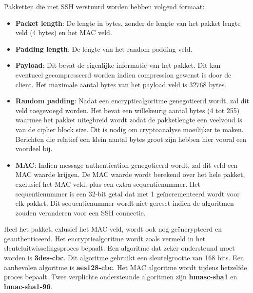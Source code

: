 \documentclass{report}
\begin{document}
Pakketten die met SSH verstuurd worden hebben volgend formaat:
	\begin{itemize}
		\item \textbf{Packet length}: De lengte in bytes, zonder de lengte van het pakket lengte veld (4 bytes) en het MAC veld.
		\item \textbf{Padding length}: De lengte van het random padding veld.
		\item \textbf{Payload}: Dit bevat de eigenlijke informatie van het pakket. Dit kan eventueel gecompresseerd worden indien compression gewenst is door de client. Het maximale aantal bytes van het payload veld is 32768 bytes.
		\item \textbf{Random padding}: Nadat een encryptiealgoritme genegotieerd wordt, zal dit veld toegevoegd worden. Het bevat een willekeurig aantal bytes (4 tot 255) waarmee het pakket uitegbreid wordt zodat de pakketlengte een veelvoud is van de cipher block size. Dit is nodig om cryptoanalyse moeilijker te maken. Berichten die relatief een klein aantal bytes groot zijn hebben hier vooral een voordeel bij.
		\item \textbf{MAC}: Indien message authentication genegotieerd wordt, zal dit veld een MAC waarde krijgen. De MAC waarde wordt berekend over het hele pakket, exclusief het MAC veld, plus een extra sequentienummer. Het sequentienummer is een 32-bit getal dat met 1 geïncrementeerd wordt voor elk pakket. Dit sequentienummer wordt niet gereset indien de algoritmen zouden veranderen voor een SSH connectie.
	\end{itemize}
	Heel het pakket, exlusief het MAC veld, wordt ook nog geëncrypteerd en geauthenticeerd. Het encryptiealgoritme wordt zoals vermeld in het sleuteluitwisselingsproces bepaalt. Een algoritme dat zeker ondersteund moet worden is \textbf{3des-cbc}. Dit algoritme gebruikt een sleutelgrootte van 168 bits. Een aanbevolen algoritme is \textbf{aes128-cbc}. Het MAC algoritme wordt tijdens hetzelfde proces bepaalt. Twee verplichte ondersteunde algoritmen zijn \textbf{hmasc-sha1} en \textbf{hmac-sha1-96}. 
\end{document}
